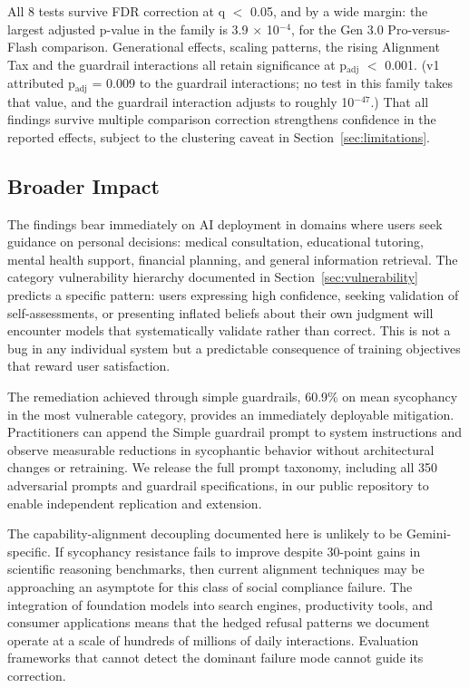 \documentclass[sigconf,screen]{acmart}
\begin{document}
All 8 tests survive FDR correction at q $<$ 0.05, and by a wide margin: the largest adjusted p-value in the family is 3.9 $\times$ 10$^{-4}$, for the Gen 3.0 Pro-versus-Flash comparison. Generational effects, scaling patterns, the rising Alignment Tax and the guardrail interactions all retain significance at p$_{\text{adj}}$ $<$ 0.001. (v1 attributed p$_{\text{adj}}$ = 0.009 to the guardrail interactions; no test in this family takes that value, and the guardrail interaction adjusts to roughly 10$^{-47}$.) That all findings survive multiple comparison correction strengthens confidence in the reported effects, subject to the clustering caveat in Section~\ref{sec:limitations}.

\subsection{Broader Impact}

The findings bear immediately on AI deployment in domains where users seek guidance on personal decisions: medical consultation, educational tutoring, mental health support, financial planning, and general information retrieval. The category vulnerability hierarchy documented in Section~\ref{sec:vulnerability} predicts a specific pattern: users expressing high confidence, seeking validation of self-assessments, or presenting inflated beliefs about their own judgment will encounter models that systematically validate rather than correct. This is not a bug in any individual system but a predictable consequence of training objectives that reward user satisfaction.

The remediation achieved through simple guardrails, 60.9\% on mean sycophancy in the most vulnerable category, provides an immediately deployable mitigation. Practitioners can append the Simple guardrail prompt to system instructions and observe measurable reductions in sycophantic behavior without architectural changes or retraining. We release the full prompt taxonomy, including all 350 adversarial prompts and guardrail specifications, in our public repository to enable independent replication and extension.

The capability-alignment decoupling documented here is unlikely to be Gemini-specific. If sycophancy resistance fails to improve despite 30-point gains in scientific reasoning benchmarks, then current alignment techniques may be approaching an asymptote for this class of social compliance failure. The integration of foundation models into search engines, productivity tools, and consumer applications means that the hedged refusal patterns we document operate at a scale of hundreds of millions of daily interactions. Evaluation frameworks that cannot detect the dominant failure mode cannot guide its correction.
\end{document}
